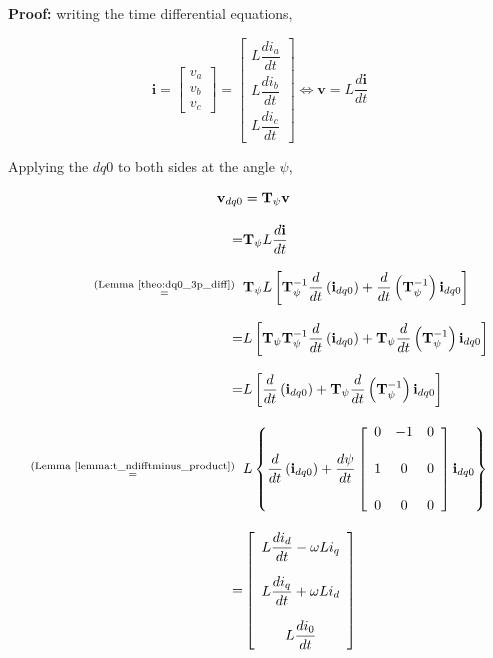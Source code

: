 \textbf{Proof:} writing the time differential equations,

\begin{equation} \mathbf{i} = 
\left[\begin{array}{c} v_a \\ v_b \\ v_c \end{array}\right] = 
\left[\begin{array}{c} L\dfrac{di_a}{dt} \\[5mm] L\dfrac{di_b}{dt} \\[5mm] L\dfrac{di_c}{dt} \end{array}\right] \Leftrightarrow
 \mathbf{v} = L\dfrac{d\mathbf{i}}{dt} \end{equation}

	Applying the $dq0$ to both sides at the angle $\psi$,

\begin{align}
	\mathbf{v}_{dq0} &= \mathbf{T}_\psi \mathbf{v} \nonumber\\[3mm]
	=& \mathbf{T}_\psi L\dfrac{d\mathbf{i}}{dt} \nonumber\\[3mm] 
	\substack{\text{(Lemma \ref{theo:dq0_3p_diff})} \\ =}\hspace{2mm}& \mathbf{T}_\psi L\left[ \mathbf{T}^{-1}_\psi \dfrac{d}{dt}\left(\mathbf{i}_{dq0}\right) + \dfrac{d}{dt}\left(\mathbf{T}^{-1}_\psi \right) \mathbf{i}_{dq0} \right] \nonumber\\[3mm] 
	=& L\left[ \mathbf{T}_\psi \mathbf{T}^{-1}_\psi  \dfrac{d}{dt}\left(\mathbf{i}_{dq0}\right) + \mathbf{T}_\psi \dfrac{d}{dt}\left(\mathbf{T}^{-1}_\psi \right) \mathbf{i}_{dq0} \right] \nonumber\\[3mm] 
	=& L\left[ \dfrac{d}{dt}\left(\mathbf{i}_{dq0}\right) + \mathbf{T}_\psi \dfrac{d}{dt}\left(\mathbf{T}^{-1}_\psi  \right) \mathbf{i}_{dq0} \right] \nonumber\\[3mm] 
	\substack{\text{(Lemma \ref{lemma:t_ndifftminus_product})}\\ =}\hspace{2mm}& L\left\{ \dfrac{d}{dt}\left(\mathbf{i}_{dq0}\right) + \dfrac{d\psi}{dt} \left[\begin{array}{ccc}    0 & -1 & 0 \\[5mm] 1 & 0  & 0 \\[5mm]  0 & 0  & 0 \end{array}\right] \mathbf{i}_{dq0} \right\} \nonumber\\[3mm]
	=&
\left[\begin{array}{c}
        L\dfrac{di_d}{dt} - \omega L i_q \\[5mm]
        L\dfrac{di_q}{dt} + \omega L i_d \\[5mm]
        L\dfrac{di_0}{dt}
\end{array}\right]
\end{align}

